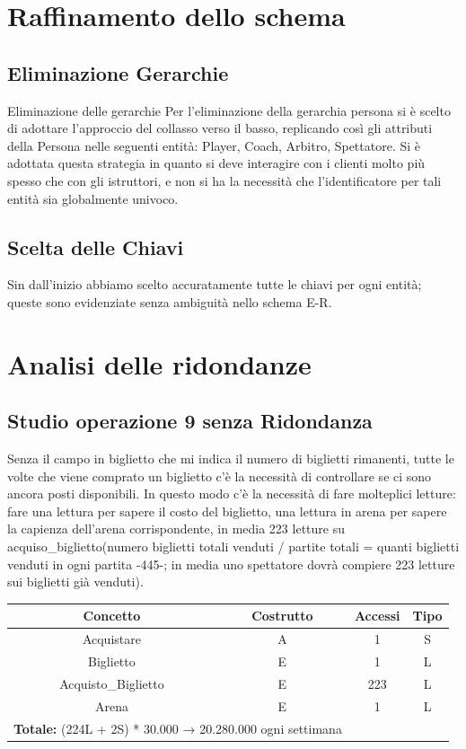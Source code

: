 \documentclass[a4paper,12pt]{report}
\begin{document}
\section{Raffinamento dello schema}
\subsection*{Eliminazione Gerarchie}
Eliminazione delle gerarchie
Per l’eliminazione della gerarchia persona si è scelto di adottare l’approccio del collasso verso
il basso, replicando così gli attributi della Persona nelle seguenti entità: Player, Coach, Arbitro, Spettatore. 
Si è adottata questa strategia in
quanto si deve interagire con i clienti molto più spesso che con gli istruttori, e non si ha la
necessità che l’identificatore per tali entità sia globalmente univoco.
\subsection*{Scelta delle Chiavi}
Sin dall'inizio abbiamo scelto accuratamente tutte le chiavi per ogni entità; queste sono evidenziate senza ambiguità nello schema E-R.
\section{Analisi delle ridondanze}
\subsection*{Studio operazione 9 senza Ridondanza}
Senza il campo in biglietto che mi indica il numero di biglietti rimanenti, tutte le volte che viene comprato un biglietto c'è la necessità di controllare se ci sono ancora posti disponibili. In questo modo c'è la necessità di fare molteplici letture: fare una lettura per sapere il costo del biglietto, una lettura in arena per sapere la capienza dell'arena corrispondente, in media 223 letture su acquiso\_biglietto(numero biglietti totali venduti / partite totali = quanti biglietti venduti in ogni partita -445-; in media uno spettatore dovrà compiere 223 letture sui biglietti già venduti).
\begin{center}
	\begin{tabular}{|c|c|c|c|}
		\hline\rowcolor{pink}
		Concetto & Costrutto & Accessi & Tipo\\
		\hline\hline		
		Acquistare & A & 1 & S\\
		Biglietto & E & 1 & L\\
		Acquisto\_Biglietto & E & 223 & L\\
		Arena & E & 1 & L\\
		\hline
		\hline
		\multicolumn{2}{l}{%
			\textbf{Totale:} (224L + 2S) * 30.000 → 20.280.000 ogni settimana} \\
		\hline
	\end{tabular}
\end{center}
\end{document}

